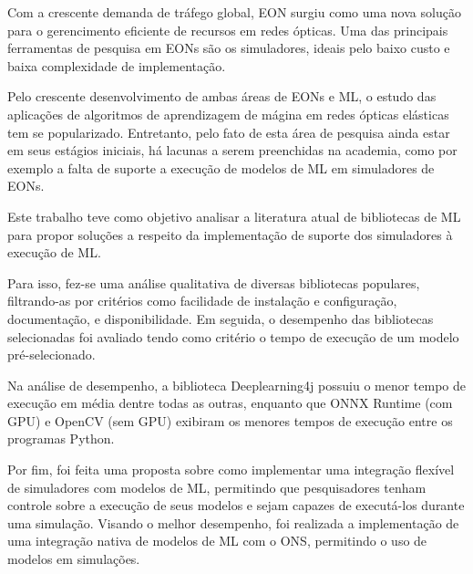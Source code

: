 Com a crescente demanda de tráfego global, \acrfull{EON} surgiu como uma nova solução para o gerencimento eficiente de recursos em redes ópticas. Uma das principais ferramentas de pesquisa em EONs são os simuladores, ideais pelo baixo custo e baixa complexidade de implementação.

Pelo crescente desenvolvimento de ambas áreas de \acrfull{EONs} e \acrfull{ML}, o estudo das aplicações de algoritmos de aprendizagem de mágina em redes ópticas elásticas tem se popularizado. Entretanto, pelo fato de esta área de pesquisa ainda estar em seus estágios iniciais, há lacunas a serem preenchidas na academia, como por exemplo a falta de suporte a execução de modelos de ML em simuladores de EONs.

Este trabalho teve como objetivo analisar a literatura atual de bibliotecas de ML para propor soluções a respeito da implementação de suporte dos simuladores à execução de ML.

Para isso, fez-se uma análise qualitativa de diversas bibliotecas populares, filtrando-as por critérios como facilidade de instalação e configuração, documentação, e disponibilidade. Em seguida, o desempenho das bibliotecas selecionadas foi avaliado tendo como critério o tempo de execução de um modelo pré-selecionado.

Na análise de desempenho, a biblioteca Deeplearning4j possuiu o menor tempo de execução em média dentre todas as outras, enquanto que ONNX Runtime (com GPU) e OpenCV (sem GPU) exibiram os menores tempos de execução entre os programas Python.

Por fim, foi feita uma proposta sobre como implementar uma integração flexível de simuladores com modelos de ML, permitindo que pesquisadores tenham controle sobre a execução de seus modelos e sejam capazes de executá-los durante uma simulação. Visando o melhor desempenho, foi realizada a implementação de uma integração nativa de modelos de ML com o \acrfull{ONS}, permitindo o uso de modelos em simulações.